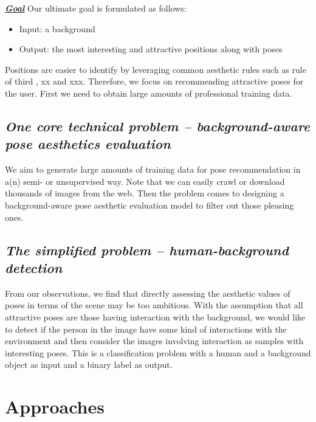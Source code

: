 \documentclass{article}
\begin{document}
\textbf{\emph{\underline{Goal}}} Our ultimate goal is formulated as follows:

\begin{itemize}
    \item Input: a background
 
    \item Output: the most interesting and attractive positions along with poses
\end{itemize}


Positions are easier to identify by leveraging common aesthetic rules such as rule of third \cite{}, xx and xxx. Therefore, we focus on recommending attractive poses for the user. First we need to obtain large amounts of professional training data. %

\subsection{\textbf{\emph{One core technical problem -- background-aware pose aesthetics evaluation}}}
We aim to generate large amounts of training data for pose recommendation in a(n) semi- or unsupervised way. Note that we can easily crawl or download thousands of images from the web. Then the problem comes to designing a background-aware pose aesthetic evaluation model to filter out those pleasing ones.

\noindent
\subsection{\textbf{\emph{The simplified problem -- human-background detection}}} 
From our observations, we find that directly assessing the aesthetic values of poses in terms of the scene may be too ambitious. With the assumption that all attractive poses are those having interaction with the background, we would like to detect if the person in the image have some kind of interactions with the environment and then consider the images involving interaction as samples with interesting poses. This is a classification problem with a human and a background object as input and a binary label as output.



\textbf{\emph{\underline{}}}

\section{Approaches}
\end{document}
